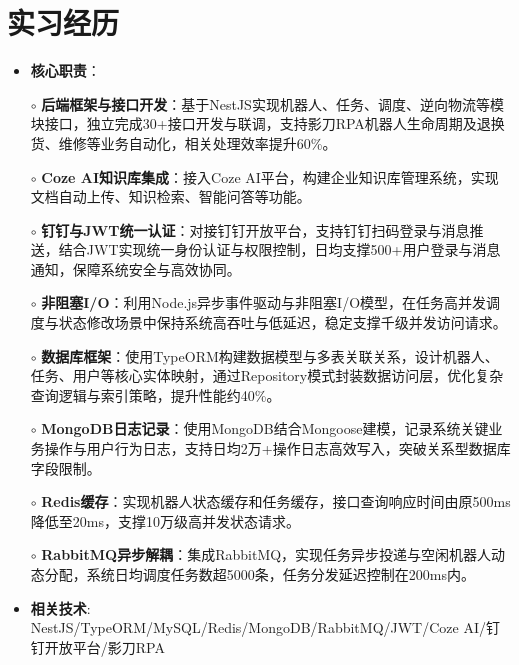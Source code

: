 \section{实习经历}
    \begin{normalsize}
      \begin{itemize}
        \item \textbf{核心职责}：
        \setlength{\itemindent}{1em} %
          \item[$\circ$] \textbf{后端框架与接口开发}：基于NestJS实现机器人、任务、调度、逆向物流等模块接口，独立完成30+接口开发与联调，支持影刀RPA机器人生命周期及退换货、维修等业务自动化，相关处理效率提升60\%。
          \item[$\circ$] \textbf{Coze AI知识库集成}：接入Coze AI平台，构建企业知识库管理系统，实现文档自动上传、知识检索、智能问答等功能。
          \item[$\circ$] \textbf{钉钉与JWT统一认证}：对接钉钉开放平台，支持钉钉扫码登录与消息推送，结合JWT实现统一身份认证与权限控制，日均支撑500+用户登录与消息通知，保障系统安全与高效协同。
          \item[$\circ$] \textbf{非阻塞I/O}：利用Node.js异步事件驱动与非阻塞I/O模型，在任务高并发调度与状态修改场景中保持系统高吞吐与低延迟，稳定支撑千级并发访问请求。
          \item[$\circ$] \textbf{数据库框架}：使用TypeORM构建数据模型与多表关联关系，设计机器人、任务、用户等核心实体映射，通过Repository模式封装数据访问层，优化复杂查询逻辑与索引策略，提升性能约40\%。
          \item[$\circ$] \textbf{MongoDB日志记录}：使用MongoDB结合Mongoose建模，记录系统关键业务操作与用户行为日志，支持日均2万+操作日志高效写入，突破关系型数据库字段限制。
          \item[$\circ$] \textbf{Redis缓存}：实现机器人状态缓存和任务缓存，接口查询响应时间由原500ms降低至20ms，支撑10万级高并发状态请求。
          \item[$\circ$] \textbf{RabbitMQ异步解耦}：集成RabbitMQ，实现任务异步投递与空闲机器人动态分配，系统日均调度任务数超5000条，任务分发延迟控制在200ms内。
        \setlength{\itemindent}{0em} %
        \item \textbf{相关技术}: NestJS/TypeORM/MySQL/Redis/MongoDB/RabbitMQ/JWT/Coze AI/钉钉开放平台/影刀RPA
        \end{itemize}
    \end{normalsize}